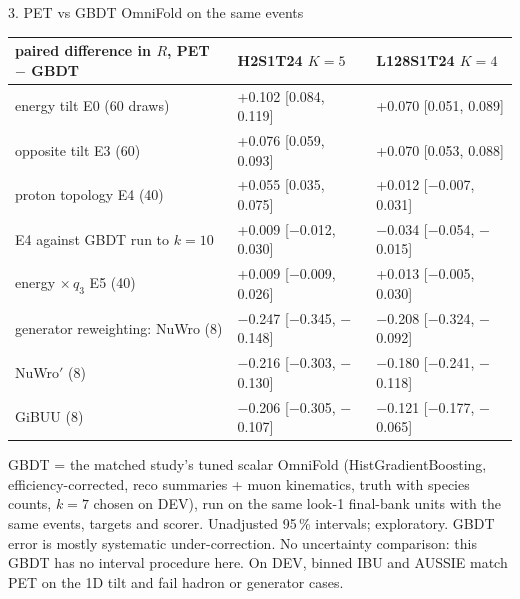 \documentclass[aspectratio=169,10pt]{beamer}
\def\evidencetext{}
\begin{document}
\gdef\evidencetext{\texttt{../gbdt\_comparison/results/comparison.json}; \texttt{../gbdt\_comparison/REPORT-20261005.md}}
\begin{frame}{3. PET vs GBDT OmniFold on the same events}
{\scriptsize
\begin{tabular}{lll}
\toprule
paired difference in $R$, PET $-$ GBDT & H2S1T24 $K{=}5$ & L128S1T24 $K{=}4$ \\
\midrule
energy tilt E0 (60 draws) & +0.102 [0.084, 0.119] & +0.070 [0.051, 0.089] \\
opposite tilt E3 (60) & +0.076 [0.059, 0.093] & +0.070 [0.053, 0.088] \\
proton topology E4 (40) & +0.055 [0.035, 0.075] & +0.012 [\ensuremath{-}0.007, 0.031] \\
\quad E4 against GBDT run to $k{=}10$ & +0.009 [\ensuremath{-}0.012, 0.030] & \ensuremath{-}0.034 [\ensuremath{-}0.054, \ensuremath{-}0.015] \\
energy $\times\,q_3$ E5 (40) & +0.009 [\ensuremath{-}0.009, 0.026] & +0.013 [\ensuremath{-}0.005, 0.030] \\
generator reweighting: NuWro (8) & \ensuremath{-}0.247 [\ensuremath{-}0.345, \ensuremath{-}0.148] & \ensuremath{-}0.208 [\ensuremath{-}0.324, \ensuremath{-}0.092] \\
\quad NuWro$'$ (8) & \ensuremath{-}0.216 [\ensuremath{-}0.303, \ensuremath{-}0.130] & \ensuremath{-}0.180 [\ensuremath{-}0.241, \ensuremath{-}0.118] \\
\quad GiBUU (8) & \ensuremath{-}0.206 [\ensuremath{-}0.305, \ensuremath{-}0.107] & \ensuremath{-}0.121 [\ensuremath{-}0.177, \ensuremath{-}0.065] \\
\bottomrule
\end{tabular}}\par{}\par\vspace{0.1cm}\tiny GBDT = the matched study's tuned scalar OmniFold (HistGradientBoosting, efficiency-corrected, reco summaries + muon kinematics, truth with species counts, $k{=}7$ chosen on DEV), run on the same look-1 final-bank units with the same events, targets and scorer. Unadjusted 95\,\% intervals; exploratory. GBDT error is mostly systematic under-correction. No uncertainty comparison: this GBDT has no interval procedure here. On DEV, binned IBU and AUSSIE match PET on the 1D tilt and fail hadron or generator cases.
\end{frame}
\end{document}
